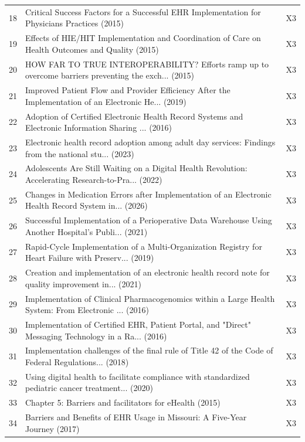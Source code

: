 \begin{longtable}{p{0.8cm} p{11.5cm} p{1.6cm}}
\rowcolor{rowgray}
18 & Critical Success Factors for a Successful EHR Implementation for Physicians Practices (2015) & X3 \\
19 & Effects of HIE/HIT Implementation and Coordination of Care on Health Outcomes and Quality (2015) & X3 \\
\rowcolor{rowgray}
20 & HOW FAR TO TRUE INTEROPERABILITY? Efforts ramp up to overcome barriers preventing the exch... (2015) & X3 \\
21 & Improved Patient Flow and Provider Efficiency After the Implementation of an Electronic He... (2019) & X3 \\
\rowcolor{rowgray}
22 & Adoption of Certified Electronic Health Record Systems and Electronic Information Sharing ... (2016) & X3 \\
23 & Electronic health record adoption among adult day services: Findings from the national stu... (2023) & X3 \\
\rowcolor{rowgray}
24 & Adolescents Are Still Waiting on a Digital Health Revolution: Accelerating Research-to-Pra... (2022) & X3 \\
25 & Changes in Medication Errors after Implementation of an Electronic Health Record System in... (2026) & X3 \\
\rowcolor{rowgray}
26 & Successful Implementation of a Perioperative Data Warehouse Using Another Hospital's Publi... (2021) & X3 \\
27 & Rapid-Cycle Implementation of a Multi-Organization Registry for Heart Failure with Preserv... (2019) & X3 \\
\rowcolor{rowgray}
28 & Creation and implementation of an electronic health record note for quality improvement in... (2021) & X3 \\
29 & Implementation of Clinical Pharmacogenomics within a Large Health System: From Electronic ... (2016) & X3 \\
\rowcolor{rowgray}
30 & Implementation of Certified EHR, Patient Portal, and "Direct" Messaging Technology in a Ra... (2016) & X3 \\
31 & Implementation challenges of the final rule of Title 42 of the Code of Federal Regulations... (2018) & X3 \\
\rowcolor{rowgray}
32 & Using digital health to facilitate compliance with standardized pediatric cancer treatment... (2020) & X3 \\
33 & Chapter 5: Barriers and facilitators for eHealth (2015) & X3 \\
\rowcolor{rowgray}
34 & Barriers and Benefits of EHR Usage in Missouri: A Five-Year Journey (2017) & X3 \\

\end{longtable}
